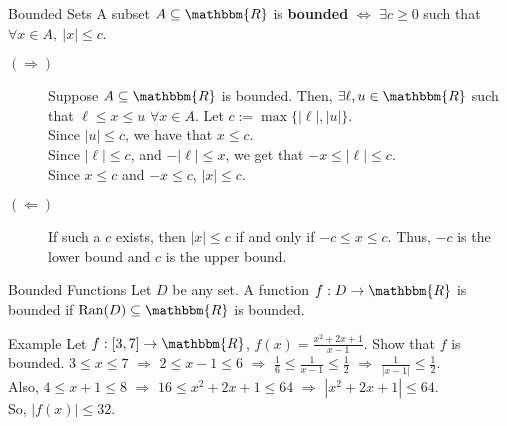 \documentclass[10pt]{extarticle}
\newcommand{\ran}{\text{Ran}}
\newcommand{\R}{\mathbbm{R}}
\begin{document}
  \begin{problem}{Bounded Sets}
    A subset $A\subseteq \R$ is \textbf{bounded} $\Leftrightarrow$  $\exists c \geq 0$ such that $\forall x\in A,~|x| \leq c$.
    \begin{description}
      \item[$(\Rightarrow)$] Suppose $A\subseteq \R$ is bounded. Then, $\exists \ell,u\in \R$ such that $\ell\leq x\leq u$ $\forall x\in A$. Let $c := \max\{|\ell|,|u|\}$.\\

        Since $|u| \leq c$, we have that $x\leq c$.\\

        Since $|\ell| \leq c$, and $-|\ell| \leq x$, we get that $-x \leq |\ell| \leq c$.\\

        Since $x\leq c$ and $-x\leq c$, $|x| \leq c$.
      \item[$(\Leftarrow)$] If such a $c$ exists, then $|x| \leq c$ if and only if $-c \leq x \leq c$. Thus, $-c$ is the lower bound and $c$ is the upper bound.
    \end{description}
    \begin{problem}{Bounded Functions}
      Let $D$ be any set. A function $f: D\rightarrow \R$ is bounded if $\ran(D)\subseteq \R$ is bounded.
    \end{problem}
    \begin{problem}{Example}
      Let $f: [3,7] \rightarrow \R$, $f(x) = \frac{x^2 + 2x + 1}{x-1}$. Show that $f$ is bounded.
      \tcblower
      $3\leq x \leq 7$ $\Rightarrow$ $2 \leq x-1 \leq 6$ $\Rightarrow$ $\frac{1}{6} \leq \frac{1}{x-1} \leq \frac{1}{2}$ $\Rightarrow$ $\frac{1}{|x-1|} \leq \frac{1}{2}$.\\

      Also, $4 \leq x+1 \leq 8$ $\Rightarrow$ $16 \leq x^2 + 2x + 1 \leq 64$ $\Rightarrow$ $|x^2 + 2x + 1| \leq 64$.\\

      So, $|f(x)| \leq 32$.
    \end{problem}
  \end{problem}
\end{document}
